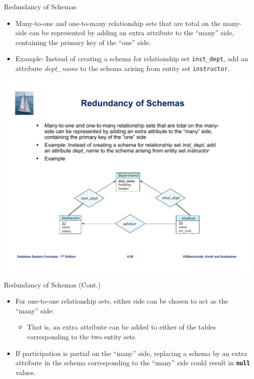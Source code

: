 \documentclass{beamer}
\begin{document}
\begin{frame}{Redundancy of Schemas}
    \begin{itemize}
        \item Many-to-one and one-to-many relationship sets that are total on the many-side can be represented by adding an extra attribute to the ``many'' side, containing the primary key of the ``one'' side.
        \item Example: Instead of creating a schema for relationship set \texttt{inst\_dept}, add an attribute \textit{dept\_name} to the schema arising from entity set \texttt{instructor}.
    \end{itemize}
    \centering
    \includegraphics[trim={2cm 4cm 2cm 10cm}, clip, width=\textwidth]{figures/redundancy}
\end{frame}

\begin{frame}{Redundancy of Schemas (Cont.)}
    \begin{itemize}
        \item For one-to-one relationship sets, either side can be chosen to act as the ``many'' side:
        \begin{itemize}
            \item That is, an extra attribute can be added to either of the tables corresponding to the two entity sets.
        \end{itemize}
        \item If participation is partial on the ``many'' side, replacing a schema by an extra attribute in the schema corresponding to the ``many'' side could result in \texttt{\textbf{null}} values.
    \end{itemize}
\end{frame}
\end{document}
